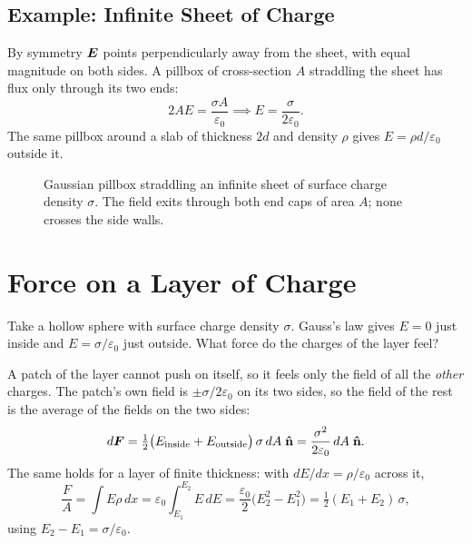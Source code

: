 \subsection{Example: Infinite Sheet of Charge}

\begin{example}
By symmetry $\vect{E}$ points perpendicularly away from the sheet, with equal magnitude on both sides. A pillbox of cross-section $A$ straddling the sheet has flux only through its two ends:
\[
    2AE = \frac{\sigma A}{\varepsilon_0}
    \implies \boxed{E = \frac{\sigma}{2\varepsilon_0}}.
\]
The same pillbox around a slab of thickness $2d$ and density $\rho$ gives $E = \rho d/\varepsilon_0$ outside it.

\begin{figure}[H]
\centering
{}
\caption{Gaussian pillbox straddling an infinite sheet of surface charge density $\sigma$. The field exits through both end caps of area $A$; none crosses the side walls.}
\end{figure}
\end{example}

\section{Force on a Layer of Charge}

Take a hollow sphere with surface charge density $\sigma$. Gauss's law gives $E=0$ just inside and $E=\sigma/\varepsilon_0$ just outside. What force do the charges of the layer feel?

A patch of the layer cannot push on itself, so it feels only the field of all the \emph{other} charges. The patch's own field is $\pm\sigma/2\varepsilon_0$ on its two sides, so the field of the rest is the average of the fields on the two sides:
\[
    d\vect{F} = \tfrac12\bigl(E_\text{inside}+E_\text{outside}\bigr)\,\sigma\,dA\;\uvect{n}
    = \frac{\sigma^2}{2\varepsilon_0}\,dA\;\uvect{n}.
\]
The same holds for a layer of finite thickness: with $dE/dx = \rho/\varepsilon_0$ across it,
\[
    \frac{F}{A} = \int E\rho\,dx = \varepsilon_0\int_{E_1}^{E_2}E\,dE = \frac{\varepsilon_0}{2}\bigl(E_2^2-E_1^2\bigr)
    = \tfrac12(E_1+E_2)\,\sigma ,
\]
using $E_2-E_1=\sigma/\varepsilon_0$.

